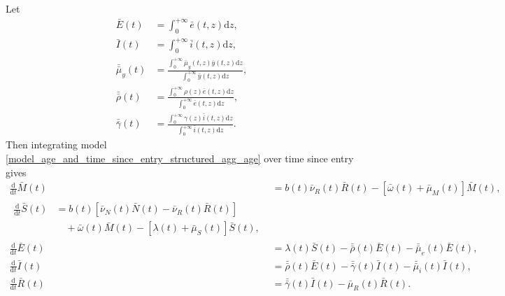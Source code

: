 \documentclass[USenglish]{article}
\newcommand{\md}{\mathrm{d}}
\begin{document}
Let
\begin{subequations}
  \begin{align}
    \bar{E}(t)
    &= \int_0^{+\infty} \bar{e}(t, z) \md z,
    \\
    \bar{I}(t)
    &= \int_0^{+\infty} \bar{i}(t, z) \md z,
    \\
    \bar{\bar{\mu}}_y(t)
    &= \frac{\int_0^{+\infty} \bar{\mu}_y(t, z) \bar{y}(t, z) \md z}
    {\int_0^{+\infty} \bar{y}(t, z) \md z},
    \\
    \bar{\bar{\rho}}(t)
    &= \frac{\int_0^{+\infty} \rho(z) \bar{e}(t, z) \md z}
    {\int_0^{+\infty} \bar{e}(t, z) \md z},
    \\
    \bar{\bar{\gamma}}(t)
    &= \frac{\int_0^{+\infty} \gamma(z) \bar{i}(t, z) \md z}
    {\int_0^{+\infty} \bar{i}(t, z) \md z}.
  \end{align}
\end{subequations}
Then integrating model
\eqref{model_age_and_time_since_entry_structured_agg_age} over time
since entry gives
\begin{subequations}
  \label{model_age_and_time_since_entry_structured_agg_age_tse}
  \begin{align}
    \frac{\md}{\md t} \bar{M}(t)
    &= b(t) \bar{\nu}_R(t) \bar{R}(t)
    - \left[\bar{\omega}(t) + \bar{\mu}_M(t)\right] \bar{M}(t),
    \\
    \begin{split}
      \frac{\md}{\md t} \bar{S}(t)
      &= b(t) \left[
        \bar{\nu}_N(t) \bar{N}(t)
        - \bar{\nu}_R(t) \bar{R}(t)
        \right]
      \\ & \quad {}
      + \bar{\omega}(t) \bar{M}(t)
      - \left[\lambda(t) + \bar{\mu}_S(t)\right] \bar{S}(t),
    \end{split}
    \\
    \frac{\md}{\md t} \bar{E}(t)
    &= \lambda(t) \bar{S}(t)
    - \bar{\bar{\rho}}(t) \bar{E}(t)
    - \bar{\bar{\mu}}_e(t) \bar{E}(t),
    \\
    \frac{\md}{\md t} \bar{I}(t)
    &= \bar{\bar{\rho}}(t) \bar{E}(t)
    - \bar{\bar{\gamma}}(t) \bar{I}(t)
    - \bar{\bar{\mu}}_i(t) \bar{I}(t),
    \\
    \frac{\md}{\md t} \bar{R}(t)
    &= \bar{\bar{\gamma}}(t) \bar{I}(t)
    - \bar{\mu}_R(t) \bar{R}(t).
  \end{align}
\end{subequations}
\end{document}
